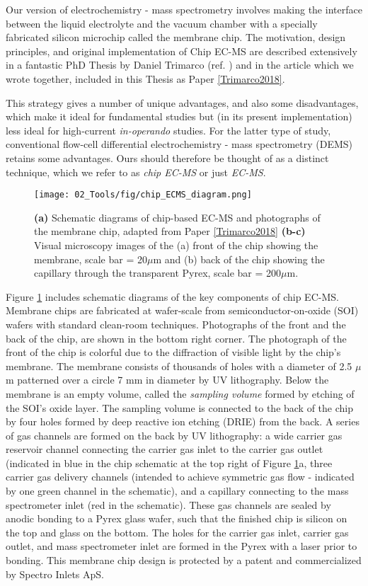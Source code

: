 Our version of electrochemistry - mass spectrometry involves making the interface between the liquid electrolyte and the vacuum chamber with a specially fabricated silicon microchip called the membrane chip. The motivation, design principles, and original implementation of Chip EC-MS are described extensively in a fantastic PhD Thesis by Daniel Trimarco (ref. \cite{Trimarco2017_PhD}) and in the article which we wrote together, included in this Thesis as Paper \ref{Trimarco2018}. 

This strategy gives a number of unique advantages, and also some disadvantages, which make it ideal for fundamental studies but (in its present implementation) less ideal for high-current \textit{in-operando} studies. For the latter type of study, conventional flow-cell differential electrochemistry - mass spectrometry (DEMS)\cite{Baltruschat2004} retains some advantages. Ours should therefore be thought of as a distinct technique, which we refer to as \textit{chip EC-MS} or just \textit{EC-MS}.

\begin{figure}[h!]
	\centering
	\texttt{[image: 02\_Tools/fig/chip\_ECMS\_diagram.png]}
	\caption{\textbf{(a)} Schematic diagrams of chip-based EC-MS and photographs of the membrane chip, adapted from Paper \ref{Trimarco2018} \textbf{(b-c)} Visual microscopy images of the (a) front of the chip showing the membrane, scale bar = 20$\mu$m and (b) back of the chip showing the capillary through the transparent Pyrex, scale bar = 200$\mu$m.}
	\label{fig:chipECMS}
\end{figure}

Figure \ref{fig:chipECMS} includes schematic diagrams of the key components of chip EC-MS. Membrane chips are fabricated at wafer-scale from semiconductor-on-oxide (SOI) wafers with standard clean-room techniques. Photographs of the front and the back of the chip, are shown in the bottom right corner. The photograph of the front of the chip is colorful due to the diffraction of visible light by the chip's membrane. The membrane consists of thousands of holes with a diameter of 2.5 $\mu$m patterned over a circle 7 mm in diameter by UV lithography. Below the membrane is an empty volume, called the \textit{sampling volume} formed by etching of the SOI's oxide layer. The sampling volume is connected to the back of the chip by four holes formed by deep reactive ion etching (DRIE) from the back. A series of gas channels are formed on the back by UV lithography: a wide carrier gas reservoir channel connecting the carrier gas inlet to the carrier gas outlet (indicated in blue in the chip schematic at the top right of Figure \ref{fig:chipECMS}a, three carrier gas delivery channels (intended to achieve symmetric gas flow - indicated by one green channel in the schematic), and a capillary connecting to the mass spectrometer inlet (red in the schematic). These gas channels are sealed by anodic bonding to a Pyrex glass wafer, such that the finished chip is silicon on the top and glass on the bottom. The holes for the carrier gas inlet, carrier gas outlet, and mass spectrometer inlet are formed in the Pyrex with a  laser prior to bonding. This membrane chip design is protected by a patent\cite{Trimarco_Patent} and commercialized by Spectro Inlets ApS.

